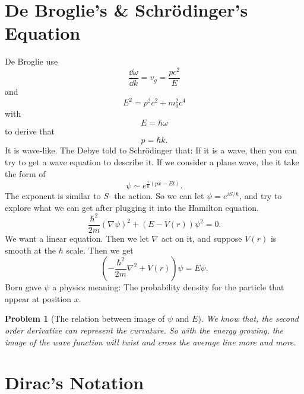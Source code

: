 \documentclass{article}
\theoremstyle{1}
\newtheorem{problem}{Problem}[section]
\begin{document}
\section{ De Broglie's \& Schrödinger's Equation}
De Broglie use 
\begin{equation}
    \frac{\dd{\omega}}{\dd{k}}=v_g=\frac{pc^2}{E}
\end{equation}
and 
\begin{equation}
    E^2=p^2c^2+m_0^2c^4
\end{equation}
with 
\begin{equation}
    E=\hbar\omega
\end{equation}
to derive that 
\begin{equation}
    p=\hbar k.
\end{equation}
It is wave-like. The Debye told to Schrödinger that: If it is a wave, then you can try to get a wave equation to describe it. 
\newline
If we consider a plane wave, the it take the form of 
\begin{equation}
    \psi\sim e^{\frac{i}{\hbar}\left(px-Et\right)}.
\end{equation}
The exponent is similar to $S$- the action. So we can let $\psi=e^{iS/\hbar}$, and try to explore what we can get after plugging  it into the Hamilton equation.
\begin{equation}
    \frac{\hbar^2}{2m}\left(\nabla \psi\right)^2+\left(E-V(r)\right)\psi^2=0.
\end{equation}
We want a linear equation. Then we let $\nabla$ act on it, and suppose $V(r)$ is smooth at the $\hbar$ scale. Then we get
\begin{equation}
    \left(-\frac{\hbar^2}{2m}\nabla^2+V(r)\right)\psi=E\psi.
\end{equation}
Born gave $\psi$ a physics meaning: The probability density for the particle that appear at position $x$.
\begin{problem}[The relation between image of $\psi$ and $E$]
    We know that, the second order derivative can represent the curvature. So with the energy growing, the image of the wave function will twist and cross the average line more and more.
    
\end{problem}



\section{Dirac's Notation}
\end{document}
